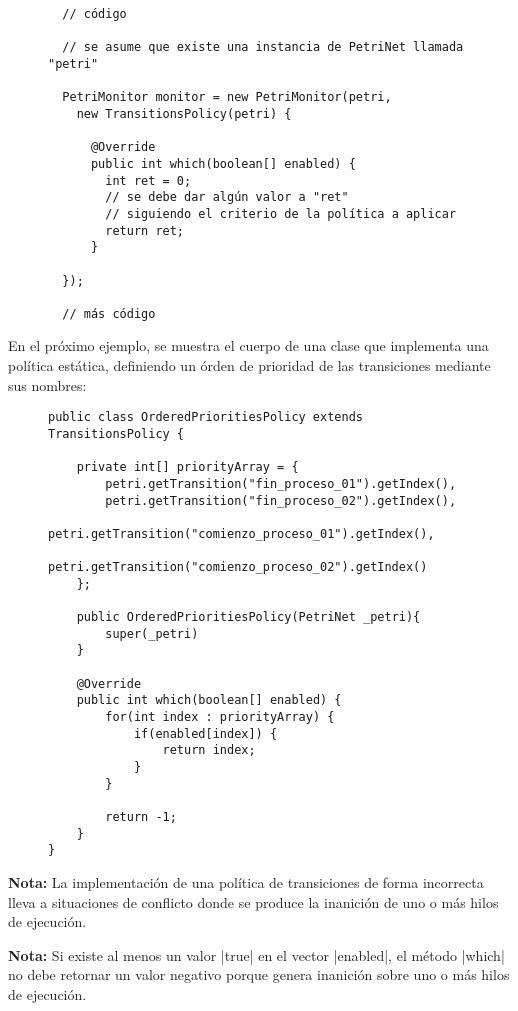 \begin{figure}[H]
\centering
\begin{verbatim}
  // código
  
  // se asume que existe una instancia de PetriNet llamada "petri"
  
  PetriMonitor monitor = new PetriMonitor(petri,
    new TransitionsPolicy(petri) {

      @Override
      public int which(boolean[] enabled) {
        int ret = 0;
        // se debe dar algún valor a "ret"
        // siguiendo el criterio de la política a aplicar
        return ret;
      }

  });
  
  // más código
\end{verbatim}
\end{figure}

En el próximo ejemplo, se muestra el cuerpo de una clase que implementa una
política estática, definiendo un órden de prioridad de las transiciones mediante sus
nombres:

\begin{figure}[H]
\centering
\begin{verbatim}
public class OrderedPrioritiesPolicy extends TransitionsPolicy {

    private int[] priorityArray = {
        petri.getTransition("fin_proceso_01").getIndex(),
        petri.getTransition("fin_proceso_02").getIndex(),
        petri.getTransition("comienzo_proceso_01").getIndex(),
        petri.getTransition("comienzo_proceso_02").getIndex()
    };

    public OrderedPrioritiesPolicy(PetriNet _petri){
        super(_petri)
    }
    
    @Override
    public int which(boolean[] enabled) {
        for(int index : priorityArray) {
            if(enabled[index]) {
                return index;
            }
        }
        
        return -1;
    }
}
\end{verbatim}
\end{figure}

\begin{framed}
\textbf{Nota:} La implementación de una política de transiciones de forma
incorrecta lleva a situaciones de conflicto donde se produce la inanición
de uno o más hilos de ejecución.
\end{framed}

\begin{framed}
\textbf{Nota:} Si existe al menos un valor |true| en el vector
|enabled|, el método |which| no debe retornar un valor
negativo porque genera inanición sobre uno o más hilos de ejecución.
\end{framed}
